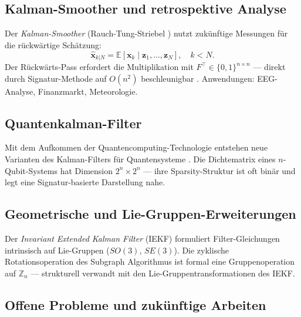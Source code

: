 ﻿\documentclass[a4paper,12pt]{article}
\theoremstyle{definition}
\begin{document}
\subsection{Kalman-Smoother und retrospektive Analyse}

Der \emph{Kalman-Smoother} (Rauch-Tung-Striebel \cite{rauch1965}) nutzt zukünftige
Messungen für die rückwärtige Schätzung:
\[
    \hat{\mathbf{x}}_{k|N} = \mathbb{E}[\mathbf{x}_k \mid \mathbf{z}_1, \ldots, \mathbf{z}_N],
    \quad k < N.
\]
Der Rückwärts-Pass erfordert die Multiplikation mit $F^\top \in \{0,1\}^{n\times n}$
--- direkt durch Signatur-Methode auf $O(n^2)$ beschleunigbar \cite{epp2026boolmm}.
Anwendungen: EEG-Analyse, Finanzmarkt, Meteorologie.

\subsection{Quantenkalman-Filter}

Mit dem Aufkommen der Quantencomputing-Technologie entstehen neue Varianten des
Kalman-Filters für Quantensysteme \cite{belavkin1992}. Die Dichtematrix eines
$n$-Qubit-Systems hat Dimension $2^n \times 2^n$ --- ihre Sparsity-Struktur ist oft
binär und legt eine Signatur-basierte Darstellung nahe.

\subsection{Geometrische und Lie-Gruppen-Erweiterungen}

Der \emph{Invariant Extended Kalman Filter} (IEKF) \cite{barrau2015} formuliert
Filter-Gleichungen intrinsisch auf Lie-Gruppen ($SO(3)$, $SE(3)$). Die zyklische
Rotationsoperation des Subgraph Algorithmus \cite{epp2026} ist formal eine
Gruppenoperation auf $\mathbb{Z}_n$ --- strukturell verwandt mit den
Lie-Gruppentransformationen des IEKF.

\subsection{Offene Probleme und zukünftige Arbeiten}
\end{document}
